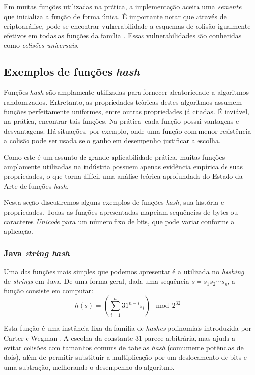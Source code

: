 Em muitas funções utilizadas na prática, a implementação aceita uma \emph{semente} que inicializa a função de forma única. É importante notar que através de criptoanálise, pode-se encontrar vulnerabilidade a esquemas de colisão igualmente efetivos em todas as funções da família \cite{bernsteinhash}. Essas vulnerabilidades são conhecidas como \emph{colisões universais}.

\subsection{Exemplos de funções \emph{hash}}

Funções \emph{hash} são amplamente utilizadas para fornecer aleatoriedade a algoritmos randomizados. Entretanto, as propriedades teóricas destes algoritmos assumem funções perfeitamente uniformes, entre outras propriedades já citadas. É inviável, na prática, encontrar tais funções. Na prática, cada função possui vantagens e desvantagens. Há situações, por exemplo, onde uma função com menor resistência a colisão pode ser usada se o ganho em desempenho justificar a escolha.

Como este é um assunto de grande aplicabilidade prática, muitas funções amplamente utilizadas na indústria possuem apenas evidência empírica de suas propriedades, o que torna difícil uma análise teórica aprofundada do Estado da Arte de funções \emph{hash}.

Nesta seção discutiremos alguns exemplos de funções \emph{hash}, sua história e propriedades. Todas as funções apresentadas mapeiam sequências de bytes ou caracteres \emph{Unicode} para um número fixo de bits, que pode variar conforme a aplicação.

\subsubsection{Java \emph{string hash}}

Uma das funções mais simples que podemos apresentar é a utilizada no \emph{hashing} de \emph{strings} em Java. De uma forma geral, dada uma sequência $s = s_1s_2\cdots s_n$, a função consiste em computar:
\[
    h(s) = \left( \sum_{i=1}^n  31^{n-i} s_i \right)\mod 2^{32}
\]

Esta função é uma instância fixa da família de \emph{hashes} polinomiais introduzida por Carter e Wegman \cite{carter1977universal}. A escolha da constante $31$ parece arbitrária, mas ajuda a evitar colisões com tamanhos comuns de tabelas \emph{hash} (comumente potências de dois), além de permitir substituir a multiplicação por um deslocamento de bits e uma subtração, melhorando o desempenho do algoritmo. 

